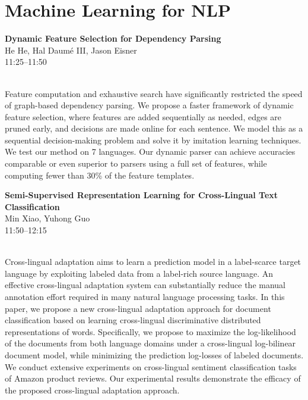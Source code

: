 \documentclass[twoside,makeidx]{book}
\begin{document}
\section{Machine Learning for NLP}
\vspace{-1em}
\par\vspace{2em}\noindent%
\begin{minipage}{\linewidth}%
\begin{center}
\textbf{\normalsize Dynamic Feature Selection for Dependency Parsing}\\
\normalsize  He He,  Hal Daum\'{e} III,  Jason Eisner\\
{\small 11:25--11:50}\\
\end{center}
\end{minipage}\\[0.5em]
\nopagebreak%
\noindent%
{\small Feature computation and exhaustive search  have significantly restricted the speed of  graph-based dependency parsing. We propose  a faster framework of dynamic feature selection,  where features are added sequentially as  needed, edges are pruned early, and decisions  are made online for each sentence. We model  this as a sequential decision-making problem  and solve it by imitation learning techniques.  We test our method on 7 languages. Our dynamic parser can achieve accuracies  comparable or even superior to parsers using  a full set of features, while computing fewer  than 30\% of the feature templates.}
\par\vspace{2em}\noindent%
\begin{minipage}{\linewidth}%
\begin{center}
\textbf{\normalsize Semi-Supervised Representation Learning for Cross-Lingual Text Classification}\\
\normalsize  Min Xiao,  Yuhong Guo\\
{\small 11:50--12:15}\\
\end{center}
\end{minipage}\\[0.5em]
\nopagebreak%
\noindent%
{\small Cross-lingual adaptation aims to learn a prediction model in a label-scarce target language by exploiting labeled data from a label-rich source language. An effective cross-lingual adaptation system can substantially reduce the manual annotation effort required in many natural language processing tasks. In this paper, we propose a new cross-lingual adaptation approach for document classification based on learning cross-lingual discriminative distributed representations of words. Specifically, we propose to maximize the log-likelihood of the documents from both language domains under a cross-lingual log-bilinear document model, while minimizing the prediction log-losses of labeled documents. We conduct extensive experiments on cross-lingual sentiment classification tasks of Amazon product reviews. Our experimental results demonstrate the efficacy of the proposed cross-lingual adaptation approach.}
\end{document}
